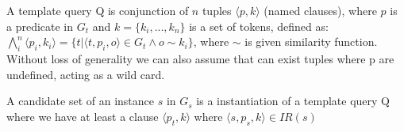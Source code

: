 \begin{definition}   A template query Q is conjunction of $n$ tuples $\langle p, k \rangle$ (named clauses), where $p$ is a predicate in $G_t$ and $k = \{k_i, ..., k_n\} $ is a set of tokens, defined as: $ \bigwedge_{i}^n \langle p_i, k_i \rangle=\{t | \langle t,p_i,o \rangle \in G_t \land o \sim k_i  \}$, where $\sim$ is given similarity function. Without loss of generality we can also assume that can exist tuples where p are undefined, acting as a wild card. 
\end{definition} 
 
\begin{definition}   A candidate set of an instance $s$ in $G_s$ is a instantiation of a template query Q where we have at least a clause $\langle p_t,k \rangle$ where $\langle s,p_s,k \rangle \in IR(s)$
\end{definition} 


